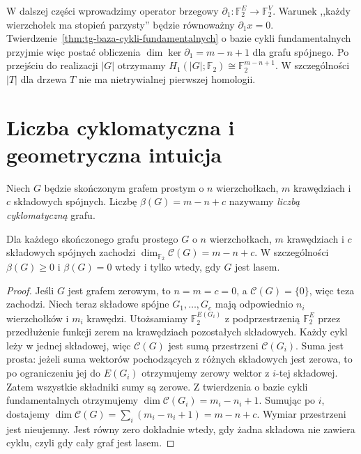 \begin{uwaga}
W dalszej części wprowadzimy operator brzegowy
$\partial_1:\mathbb F_2^E\to\mathbb F_2^V$.
Warunek ,,każdy wierzchołek ma stopień
parzysty'' będzie równoważny $\partial_1x=0$.
Twierdzenie~\ref{thm:tg-baza-cykli-fundamentalnych} o bazie cykli fundamentalnych
przyjmie więc postać obliczenia
$\dim\ker\partial_1=m-n+1$ dla grafu spójnego.
Po przejściu do realizacji $|G|$ otrzymamy
$H_1(|G|;\mathbb F_2)\cong\mathbb F_2^{m-n+1}$.
W szczególności $|T|$ dla drzewa $T$
nie ma nietrywialnej pierwszej homologii.
\end{uwaga}

\section{Liczba cyklomatyczna i geometryczna intuicja}
\label{sec:tg-cyklomatyczna}

\begin{definicja}
Niech $G$ będzie skończonym grafem prostym
o $n$ wierzchołkach, $m$ krawędziach
i $c$ składowych spójnych. Liczbę
$\beta(G)=m-n+c$ nazywamy
\emph{liczbą cyklomatyczną} grafu.
\end{definicja}

\begin{twierdzenie}
Dla każdego skończonego grafu prostego $G$ o $n$
wierzchołkach, $m$ krawędziach i $c$ składowych spójnych
zachodzi $\dim_{\mathbb F_2}\mathcal C(G)=m-n+c$.
W szczególności $\beta(G)\ge0$ i
$\beta(G)=0$ wtedy i tylko wtedy, gdy
$G$ jest lasem.
\end{twierdzenie}

\begin{proof}
Jeśli $G$ jest grafem zerowym, to $n=m=c=0$,
a $\mathcal C(G)=\{0\}$, więc teza zachodzi.
Niech teraz składowe spójne $G_1,\ldots,G_c$
mają odpowiednio $n_i$ wierzchołków i $m_i$ krawędzi.
Utożsamiamy $\mathbb F_2^{E(G_i)}$ z podprzestrzenią
$\mathbb F_2^E$ przez przedłużenie funkcji zerem
na krawędziach pozostałych składowych.
Każdy cykl leży w jednej składowej, więc
$\mathcal C(G)$ jest sumą przestrzeni $\mathcal C(G_i)$.
Suma jest prosta: jeżeli suma wektorów pochodzących
z różnych składowych jest zerowa, to po ograniczeniu
jej do $E(G_i)$ otrzymujemy zerowy wektor z $i$-tej
składowej. Zatem wszystkie składniki sumy są zerowe. Z twierdzenia
o bazie cykli fundamentalnych otrzymujemy
$\dim\mathcal C(G_i)=m_i-n_i+1$.
Sumując po $i$, dostajemy
$\dim\mathcal C(G)=\sum_i(m_i-n_i+1)=m-n+c$.
Wymiar przestrzeni jest nieujemny.
Jest równy zero dokładnie wtedy, gdy
żadna składowa nie zawiera cyklu, czyli
gdy cały graf jest lasem.
\end{proof}

